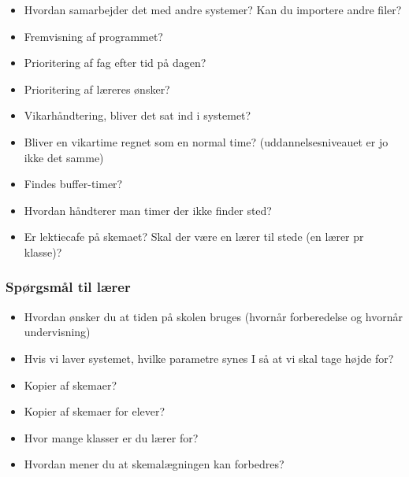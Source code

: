 \documentclass[hidelinks, 12pt]{article}
\begin{document}
\begin{itemize}
		\item Hvordan samarbejder det med andre systemer? Kan du importere andre filer?
		\item Fremvisning af programmet?
		\item Prioritering af fag efter tid på dagen?
		\item Prioritering af læreres ønsker?
		\item Vikarhåndtering, bliver det sat ind i systemet?
		\item Bliver en vikartime regnet som en normal time? (uddannelsesniveauet er jo ikke det samme)
		\item Findes buffer-timer? 
		\item Hvordan håndterer man timer der ikke finder sted?
		\item Er lektiecafe på skemaet? Skal der være en lærer til stede (en lærer pr klasse)?
	\end{itemize}
	\subsubsection*{Spørgsmål til lærer}
	\begin{itemize}
	\item Hvordan ønsker du at tiden på skolen bruges (hvornår forberedelse og hvornår undervisning)
	\item Hvis vi laver systemet, hvilke parametre synes I så at vi skal tage højde for?
	\item Kopier af skemaer?
	\item Kopier af skemaer for elever?
	\item Hvor mange klasser er du lærer for?
	\item Hvordan mener du at skemalægningen kan forbedres?
	\end{itemize}
\end{document}
